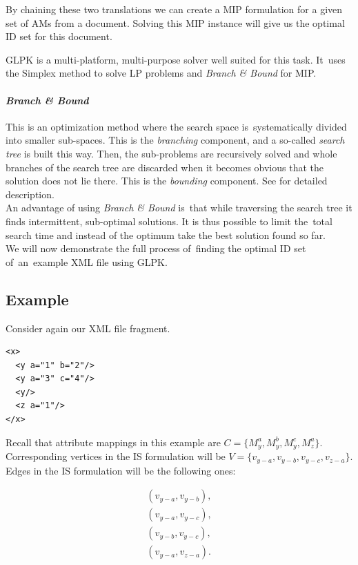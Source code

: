 By chaining these two translations we can create a MIP formulation for a given set of AMs from a document. Solving this MIP instance will give us the optimal ID set for this document.

GLPK is a multi-platform, multi-purpose solver well suited for this task. It~uses the Simplex method to solve LP problems and \textit{Branch \& Bound} for MIP. 

\paragraph{\textit{Branch \& Bound}} This is an optimization method where the search space is~systematically divided into smaller sub-spaces. This is the \textit{branching} component, and a so-called \textit{search tree} is built this way. Then, the sub-problems are recursively solved and whole branches of the search tree are discarded when it becomes obvious that the solution does not lie there. This is the \textit{bounding} component. See \cite{land60a} for detailed description.\\

An advantage of using \textit{Branch \& Bound} is~that while traversing the search tree it finds intermittent, sub-optimal solutions. It is thus possible to limit the~total search time and instead of the optimum take the best solution found so far.\\

We will now demonstrate the full process of~finding the optimal ID set of~an~example XML file using GLPK.

\subsection*{Example}

Consider again our XML file fragment.

\begin{verbatim}
<x>
  <y a="1" b="2"/>
  <y a="3" c="4"/>
  <y/>
  <z a="1"/>
</x>
\end{verbatim}

Recall that attribute mappings in this example are $C = \{M_{y}^{a}, M_{y}^{b}, M_{y}^{c}, M_{z}^{a}\}$. Corresponding vertices in the IS formulation will be $V = \{v_{y-a}, v_{y-b}, v_{y-c}, v_{z-a}\}$. Edges in the IS formulation will be the following ones:

\begin{eqnarray*}
(v_{y-a},v_{y-b}), \\
(v_{y-a},v_{y-c}), \\
(v_{y-b},v_{y-c}), \\
(v_{y-a},v_{z-a}). \\
\end{eqnarray*}

